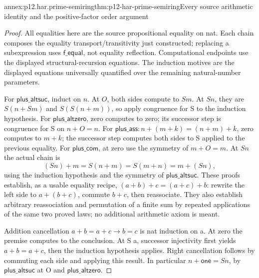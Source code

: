 \begin{annexitem}{annex:p12.har.prime-semiring}{thm:p12-har-prime-semiring}{Every source arithmetic identity and the positive-factor order argument}
\begin{proof}
All equalities here are the source propositional equality on nat. Each
chain composes the equality transport/transitivity just constructed;
replacing a subexpression uses \(\mathsf{f\_equal}\), not equality reflection.
Computational endpoints use the displayed structural-recursion equations.
The induction motives are the displayed equations universally quantified
over the remaining natural-number parameters.

For \(\mathsf{plus\_altsuc}\), induct on \(n\).
At \(O\), both sides compute to \(S m\). At \(S n\), they are
\(S(n+S m)\) and \(S(S(n+m))\), so apply congruence for S to the
induction hypothesis. For \(\mathsf{plus\_altzero}\), zero computes
to zero; its successor step is congruence for S on \(n+O=n\).
For \(\mathsf{plus\_ass}:n+(m+k)=(n+m)+k\), zero computes to
\(m+k\); the successor step computes both sides to S applied to
the previous equality. For \(\mathsf{plus\_com}\), at zero use
the symmetry of \(m+O=m\). At \(S n\) the actual chain is
\[
 (S n)+m=S(n+m)=S(m+n)=m+(S n),
\]
using the induction hypothesis and the symmetry of \(\mathsf{plus\_altsuc}\).
These proofs establish, as a usable equality recipe,
\((a+b)+c=(a+c)+b\): rewrite the left side to \(a+(b+c)\),
commute \(b+c\), then reassociate. They also establish arbitrary
reassociation and permutation of a finite sum by repeated applications
of the same two proved laws; no additional arithmetic axiom is meant.

Addition cancellation \(a+b=a+c\to b=c\) is nat induction on a.
At zero the premise computes to the conclusion. At S a, successor
injectivity first yields \(a+b=a+c\), then the induction hypothesis
applies. Right cancellation follows by commuting each side and applying
this result. In particular \(n+\mathsf{one}=S n\), by \(\mathsf{plus\_altsuc}\)
at O and \(\mathsf{plus\_altzero}\).


\end{proof}
\end{annexitem}
